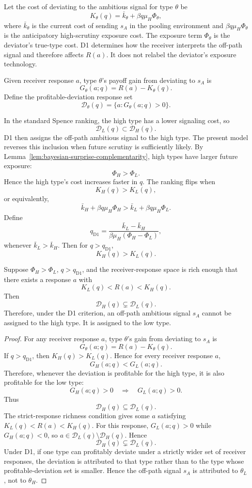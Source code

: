 Let the cost of deviating to the ambitious signal for type \(\theta\) be
\[
K_\theta(q)=\bar k_\theta+\beta q\mu_H\Phi_\theta,
\]
where \(\bar k_\theta\) is the current cost of sending \(s_A\) in the pooling environment and \(\beta q\mu_H\Phi_\theta\) is the anticipatory high-scrutiny exposure cost. The exposure term \(\Phi_\theta\) is the deviator's true-type cost. D1 determines how the receiver interprets the off-path signal and therefore affects \(R(a)\). It does not relabel the deviator's exposure technology.

Given receiver response \(a\), type \(\theta\)'s payoff gain from deviating to \(s_A\) is
\[
G_\theta(a;q)=R(a)-K_\theta(q).
\]
Define the profitable-deviation response set
\[
\mathcal D_\theta(q)=\{a:G_\theta(a;q)>0\}.
\]

In the standard Spence ranking, the high type has a lower signaling cost, so
\[
\mathcal D_L(q)\subset \mathcal D_H(q).
\]
D1 then assigns the off-path ambitious signal to the high type. The present model reverses this inclusion when future scrutiny is sufficiently likely. By Lemma~\ref{lem:bayesian-surprise-complementarity}, high types have larger future exposure:
\[
\Phi_H>\Phi_L.
\]
Hence the high type's cost increases faster in \(q\). The ranking flips when
\[
K_H(q)>K_L(q),
\]
or equivalently,
\[
\bar k_H+\beta q\mu_H\Phi_H>
\bar k_L+\beta q\mu_H\Phi_L.
\]
Define
\[
q_{\mathrm{D1}}=
\frac{\bar k_L-\bar k_H}{\beta\mu_H(\Phi_H-\Phi_L)},
\]
whenever \(\bar k_L>\bar k_H\). Then for \(q>q_{\mathrm{D1}}\),
\[
K_H(q)>K_L(q).
\]

\begin{lemma}[D1 flip]
\label{lem:d1-flip}
Suppose \(\Phi_H>\Phi_L\), \(q>q_{\mathrm{D1}}\), and the receiver-response space is rich enough that there exists a response \(a\) with
\[
K_L(q)<R(a)<K_H(q).
\]
Then
\[
\mathcal D_H(q)\subsetneq \mathcal D_L(q).
\]
Therefore, under the D1 criterion, an off-path ambitious signal \(s_A\) cannot be assigned to the high type. It is assigned to the low type.
\end{lemma}

\begin{proof}
For any receiver response \(a\), type \(\theta\)'s gain from deviating to \(s_A\) is
\[
G_\theta(a;q)=R(a)-K_\theta(q).
\]
If \(q>q_{\mathrm{D1}}\), then \(K_H(q)>K_L(q)\). Hence for every receiver response \(a\),
\[
G_H(a;q)<G_L(a;q).
\]
Therefore, whenever the deviation is profitable for the high type, it is also profitable for the low type:
\[
G_H(a;q)>0
\quad\Rightarrow\quad
G_L(a;q)>0.
\]
Thus
\[
\mathcal D_H(q)\subseteq\mathcal D_L(q).
\]
The strict-response richness condition gives some \(a\) satisfying \(K_L(q)<R(a)<K_H(q)\). For this response, \(G_L(a;q)>0\) while \(G_H(a;q)<0\), so \(a\in\mathcal D_L(q)\setminus\mathcal D_H(q)\). Hence
\[
\mathcal D_H(q)\subsetneq\mathcal D_L(q).
\]
Under D1, if one type can profitably deviate under a strictly wider set of receiver responses, the deviation is attributed to that type rather than to the type whose profitable-deviation set is smaller. Hence the off-path signal \(s_A\) is attributed to \(\theta_L\), not to \(\theta_H\).
\end{proof}

